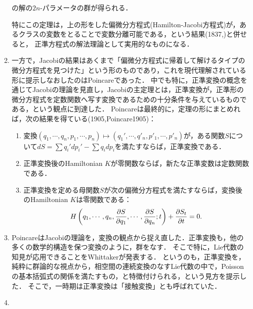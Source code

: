 \documentclass[uplatex, dvipdfmx]{jsreport}
\begin{document}
\begin{enumerate}
\begin{theorem}
        の解の$2n$-パラメータの群が得られる．
    \end{theorem}
    特にこの定理は，上の形をした偏微分方程式(Hamilton-Jacobi方程式)が，あるクラスの変数をとることで変数分離可能である，という結果(1837,\cite{Jacobi37C})と併せると，
    正準方程式の解法理論として実用的なものになる．
    \item 一方で，Jacobiの結果はあくまで「偏微分方程式に帰着して解けるタイプの微分方程式を見つけた」という形のものであり，これを現代理解されている形に提示しなおしたのはPoincareであった．
    中でも特に，正準変換の概念を通じてJacobiの理論を見直し，Jacobiの主定理とは，正準変換が，正準形の微分方程式を定数関数へ写す変換であるための十分条件を与えているものである，という観点に到達した．
    Poincareは最終的に，定理の形にまとめれば，次の結果を得ている(1905,Poincare1905)：
    \begin{theorem}\mbox{}
        \begin{enumerate}
            \item 変換$(q_1,\cdots,q_n,p_1,\cdots,p_n)\mapsto(q_1',\cdots,q'_n,p'_1,\cdots,p'_n)$が，ある関数$S$について$dS=\sum q_i'dp_i'-\sum q_idp_i$を満たすならば，正準変換である．
            \item 正準変換後のHamiltonian $K$が零関数ならば，新たな正準変数は定数関数である．
            \item 正準変換を定める母関数$S$が次の偏微分方程式を満たすならば，変換後のHamiltonian $K$は零関数である：
            \[H\left(q_1,\cdots,q_n,\frac{\partial S}{\partial q_1},\cdots,\frac{\partial S}{\partial q_n};t\right)+\frac{\partial S_t}{\partial t}=0.\]
        \end{enumerate}
    \end{theorem}
    \item PoincareはJacobiの理論を，変換の観点から捉え直した．正準変換も，他の多くの数学的構造を保つ変換のように，群をなす．
    そこで特に，Lie代数の知見が応用できることをWhittakerが発表する．
    というのも，正準変換を，純粋に群論的な視点から，相空間の連続変換のなすLie代数の中で，Poissonの基本括弧式の関係を満たすもの，と特徴付けられる，という見方を提示した．
    そこで，一時期は正準変換は「接触変換」とも呼ばれていた．
    \item 
\end{enumerate}
\end{document}
